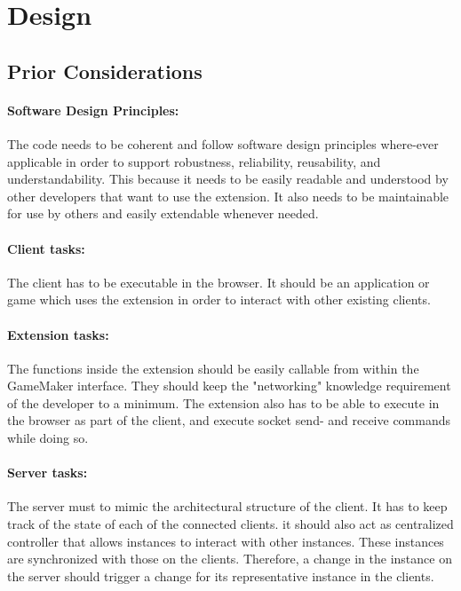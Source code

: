 \documentclass[bsc,frontabs,twoside,singlespacing,parskip,deptreport]{infthesis}     %
\begin{document}
\section{Design}
\subsection{Prior Considerations}
\paragraph*{Software Design Principles:}
The code needs to be coherent and follow software design principles where-ever applicable in order to support robustness, reliability, reusability, and understandability. This because it needs to be easily readable and understood by other developers that want to use the extension. It also needs to be maintainable for use by others and easily extendable whenever needed.
\paragraph*{Client tasks:}
The client has to be executable in the browser. It should be an application or game which uses the extension in order to interact with other existing clients.
\paragraph*{Extension tasks:}
The functions inside the extension should be easily callable from within the GameMaker interface. They should keep the "networking" knowledge requirement of the developer to a minimum. The extension also has to be able to execute in the browser as part of the client, and execute socket send- and receive commands while doing so.
\paragraph*{Server tasks:}
The server must to mimic the architectural structure of the client. It has to keep track of the state of each of the connected clients. it should also act as centralized controller that allows instances to interact with other instances. These instances are synchronized with those on the clients. Therefore, a change in the instance on the server should trigger a change for its representative instance in the clients.
\end{document}
